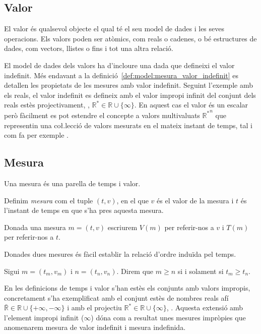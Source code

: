 \subsection{Valor}

El valor és qualsevol objecte el qual té el seu model de dades i les seves operacions. Els valors poden ser atòmics, com reals o cadenes, o bé estructures de dades, com vectors, llistes o fins i tot una altra relació.

El model de dades dels valors ha d'incloure una dada que defineixi el valor indefinit. Més endavant a la definició~\ref{def:model:mesura_valor_indefinit} es detallen les propietats de les mesures amb valor indefinit. Seguint l'exemple amb els reals, el valor indefinit es defineix amb el valor impropi infinit del conjunt dels reals estès projectivament, \parencite{cantrell:projectivelyextendedreal}, $\mathbb{R}^*\in\mathbb{R} \cup \{\infty\}$.  En aquest cas el valor és un escalar però fàcilment es pot estendre el concepte a valors multivaluats ${\mathbb{R}^*}^n$ que representin una co\l.lecció de valors mesurats en el mateix instant de temps, tal i com fa per exemple \textcite{assfalg08:thesis}. 





\subsection{Mesura}\label{sec:model:mesura} 

Una mesura és una parella de temps i valor.

\begin{definition}[Mesura]
  \label{def:model:mesura}
  Definim \emph{mesura} com el tuple $(t,v)$, en el que $v$ és el
  valor de la mesura i $t$ és l'instant de temps en que s'ha pres
  aquesta mesura.
\end{definition}


Donada una mesura $m=(t,v)$ escriurem $V(m)$ per referir-nos a $v$ i
$T(m)$ per referir-nos a $t$.

Donades dues mesures és fàcil establir la relació d'ordre induïda pel
temps.

\begin{definition}
  \label{def:model:mesura-relacio-ordre}
  Sigui $m=(t_m,v_m)$ i $n=(t_n,v_n)$. Direm que $m\geq n$ si i solament
  si $t_m\geq t_n$.
\end{definition}


En les definicions de temps i valor s'han estès els conjunts amb valors impropis, concretament s'ha exemplificat amb el conjunt estès de
nombres reals afí $\bar{\mathbb{R}} \in \mathbb{R} \cup
\{+\infty,-\infty\}$ i amb el projectiu $\mathbb{R}^*\in\mathbb{R} \cup \{\infty\}$, \parencite{cantrell:extendedreal,cantrell:projectivelyextendedreal}. Aquesta extensió amb l'element impropi
infinit ($\infty$) dóna com a resultat unes mesures impròpies que
anomenarem mesura de valor indefinit i mesura indefinida.

